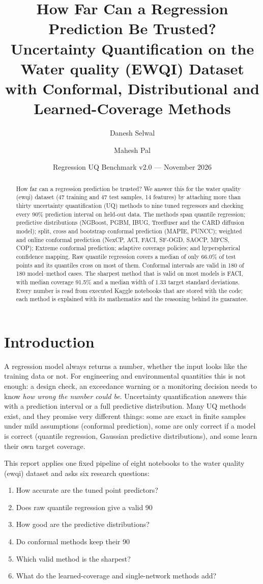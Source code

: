 \documentclass[11pt]{article}
\title{How Far Can a Regression Prediction Be Trusted?\\[2pt] \large Uncertainty Quantification on the Water quality (EWQI) Dataset with Conformal, Distributional and Learned-Coverage Methods}
\author{Danesh Selwal \and Mahesh Pal}
\date{Regression UQ Benchmark v2.0 --- November 2026}
\begin{document}
\maketitle
\begin{abstract}How far can a regression prediction be trusted? We answer this for the water quality (ewqi) dataset (47 training and 47 test samples, 14 features) by attaching more than thirty uncertainty quantification (UQ) methods to nine tuned regressors and checking every 90\% prediction interval on held-out data. The methods span quantile regression; predictive distributions (NGBoost, PGBM, IBUG, Treeffuser and the CARD diffusion model); split, cross and bootstrap conformal prediction (MAPIE, PUNCC); weighted and online conformal prediction (NexCP, ACI, FACI, SF-OGD, SAOCP, MFCS, COP); Extreme conformal prediction; adaptive coverage policies; and hyperspherical confidence mapping. Raw quantile regression covers a median of only 66.0\% of test points and its quantiles cross on most of them. Conformal intervals are valid in 180 of 180 model--method cases. The sharpest method that is valid on most models is FACI, with median coverage 91.5\% and a median width of 1.33 target standard deviations. Every number is read from executed Kaggle notebooks that are stored with the code; each method is explained with its mathematics and the reasoning behind its guarantee.\end{abstract}
\tableofcontents
\newpage
\section{Introduction}
A regression model always returns a number, whether the input looks like the training data or not. For engineering and environmental
quantities this is not enough: a design check, an exceedance warning or a monitoring decision needs to know \emph{how wrong the number could be}.
Uncertainty quantification answers this with a prediction interval or a full predictive distribution. Many UQ methods exist, and they
promise very different things: some are exact in finite samples under mild assumptions (conformal prediction), some are only correct if a
model is correct (quantile regression, Gaussian predictive distributions), and some learn their own target coverage.

This report applies one fixed pipeline of eight notebooks to the water quality (ewqi) dataset and asks six research questions:
\begin{enumerate}[label=\textbf{RQ\arabic*.}]
\item How accurate are the tuned point predictors?
\item Does raw quantile regression give a valid 90%
\item How good are the predictive distributions?
\item Do conformal methods keep their 90%
\item Which valid method is the sharpest?
\item What do the learned-coverage and single-network methods add?
\end{enumerate}
\end{document}
